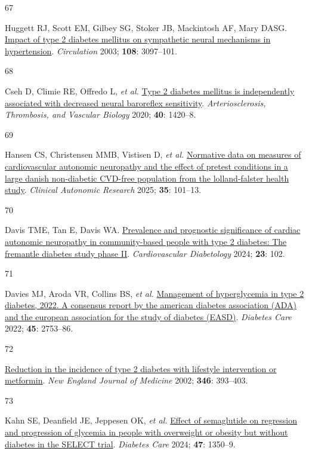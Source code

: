 \documentclass[
  a4paper,
  headsepline=true,
  open=left]{scrbook}
\newlength{\cslhangindent}
\newlength{\csllabelwidth}
\newlength{\cslentryspacingunit} %
\newenvironment{CSLReferences}[2] %
 {%
  \setlength{\parindent}{0pt}
  \ifodd #1
  \let\oldpar\par
  \def\par{\hangindent=\cslhangindent\oldpar}
  \fi
  \setlength{\parskip}{#2\cslentryspacingunit}
 }%
 {}
\newcommand{\CSLLeftMargin}[1]{\parbox[t]{\csllabelwidth}{#1}}
\newcommand{\CSLRightInline}[1]{\parbox[t]{\linewidth - \csllabelwidth}{#1}\break}
\begin{document}
\begin{CSLReferences}{0}{0}
\leavevmode{}%
\CSLLeftMargin{67 }%
\CSLRightInline{Huggett RJ, Scott EM, Gilbey SG, Stoker JB, Mackintosh
AF, Mary DASG.
\href{https://doi.org/10.1161/01.CIR.0000103123.66264.FE}{Impact of type
2 diabetes mellitus on sympathetic neural mechanisms in hypertension}.
\emph{Circulation} 2003; \textbf{108}: 3097--101.}

\leavevmode{}%
\CSLLeftMargin{68 }%
\CSLRightInline{Cseh D, Climie RE, Offredo L, \emph{et al.}
\href{https://doi.org/10.1161/ATVBAHA.120.314102}{Type 2 diabetes
mellitus is independently associated with decreased neural baroreflex
sensitivity}. \emph{Arteriosclerosis, Thrombosis, and Vascular Biology}
2020; \textbf{40}: 1420--8.}

\leavevmode{}%
\CSLLeftMargin{69 }%
\CSLRightInline{Hansen CS, Christensen MMB, Vistisen D, \emph{et al.}
\href{https://doi.org/10.1007/s10286-024-01069-6}{Normative data on
measures of cardiovascular autonomic neuropathy and the effect of
pretest conditions in a large danish non-diabetic CVD-free population
from the lolland-falster health study}. \emph{Clinical Autonomic
Research} 2025; \textbf{35}: 101--13.}

\leavevmode{}%
\CSLLeftMargin{70 }%
\CSLRightInline{Davis TME, Tan E, Davis WA.
\href{https://doi.org/10.1186/s12933-024-02185-3}{Prevalence and
prognostic significance of cardiac autonomic neuropathy in
community-based people with type 2 diabetes: The fremantle diabetes
study phase II}. \emph{Cardiovascular Diabetology} 2024; \textbf{23}:
102.}

\leavevmode{}%
\CSLLeftMargin{71 }%
\CSLRightInline{Davies MJ, Aroda VR, Collins BS, \emph{et al.}
\href{https://doi.org/10.2337/dci22-0034}{Management of hyperglycemia in
type 2 diabetes, 2022. A consensus report by the american diabetes
association (ADA) and the european association for the study of diabetes
(EASD)}. \emph{Diabetes Care} 2022; \textbf{45}: 2753--86.}

\leavevmode{}%
\CSLLeftMargin{72 }%
\CSLRightInline{\href{https://doi.org/10.1056/NEJMoa012512}{Reduction in
the incidence of type 2 diabetes with lifestyle intervention or
metformin}. \emph{New England Journal of Medicine} 2002; \textbf{346}:
393--403.}

\leavevmode{}%
\CSLLeftMargin{73 }%
\CSLRightInline{Kahn SE, Deanfield JE, Jeppesen OK, \emph{et al.}
\href{https://doi.org/10.2337/dc24-0491}{Effect of semaglutide on
regression and progression of glycemia in people with overweight or
obesity but without diabetes in the SELECT trial}. \emph{Diabetes Care}
2024; \textbf{47}: 1350--9.}


\end{CSLReferences}
\end{document}

